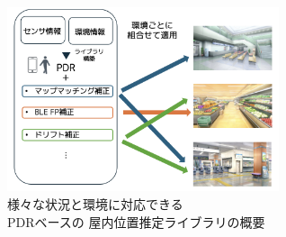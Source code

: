 \begin{figure}[h]
	\centering
	\includegraphics[width=80mm]{image/first.png}
	\caption{様々な状況と環境に対応できる\\PDRベースの
		屋内位置推定ライブラリの概要}    \label{fig:overview}
\end{figure}


